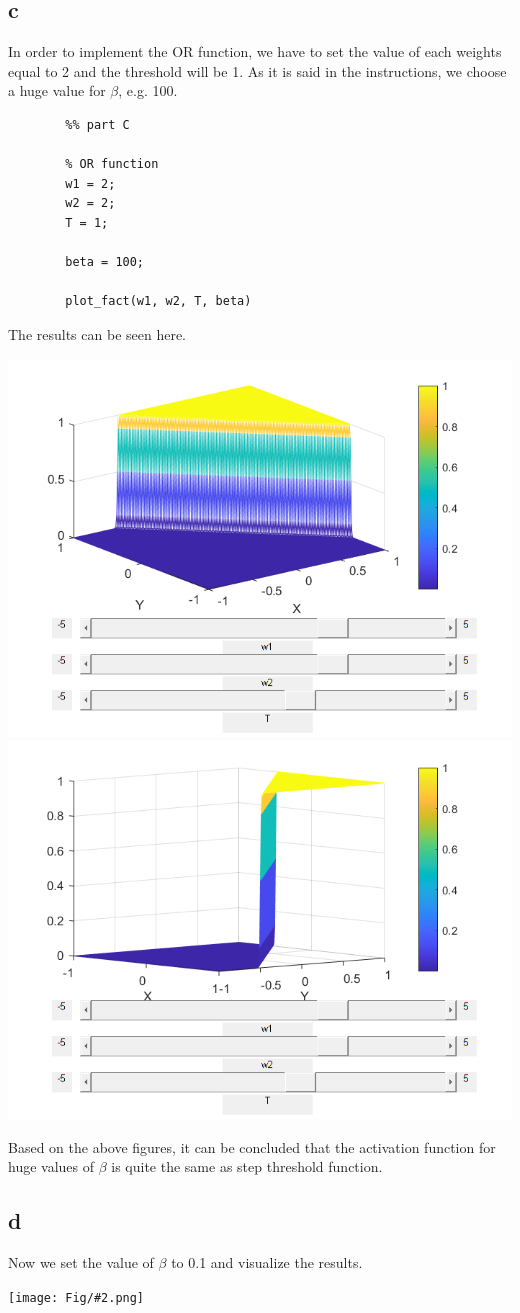 \documentclass[]{article}
\newcommand{\pict}[2]{\begin{center}
		\texttt{[image: Fig/\#2.png]}
\end{center}}
\begin{document}
	\subsection*{c}
	In order to implement the OR function, we have to set the value of each weights equal to 2 and the threshold will be 1. As it is said in the instructions, we choose a huge value for $\beta$, e.g. 100.
	\begin{lstlisting}
		%% part C
		
		% OR function
		w1 = 2;
		w2 = 2;
		T = 1;
		
		beta = 100;
		
		plot_fact(w1, w2, T, beta)
	\end{lstlisting}
	The results can be seen here.
	\begin{center}
		\includegraphics[width=0.4\linewidth]{Fig/Q1_F4.png}
		\qquad\qquad
		\includegraphics[width=0.4\linewidth]{Fig/Q1_F5.png}
	\end{center}
	Based on the above figures, it can be concluded that the activation function for huge values of $\beta$ is quite the same as step threshold function.
	
	\subsection*{d}
	Now we set the value of $\beta$ to 0.1 and visualize the results.
	\pict{0.5}{Q1_F6}
	
\end{document}

